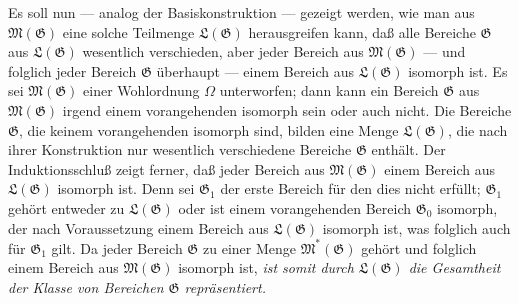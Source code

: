 Es soll nun --- analog der Basiskonstruktion --- gezeigt werden, wie man aus
$\mathfrak M(\mathfrak G)$ eine solche Teilmenge $\mathfrak L(\mathfrak G)$
herausgreifen kann, daß alle Bereiche $\mathfrak G$ aus
$\mathfrak L(\mathfrak G)$ wesentlich verschieden, aber jeder Bereich aus
$\mathfrak M(\mathfrak G)$ --- und folglich jeder Bereich $\mathfrak G$
überhaupt --- einem Bereich aus $\mathfrak L(\mathfrak G)$ isomorph ist. Es sei
$\mathfrak M(\mathfrak G)$ einer Wohlordnung $\Omega$ unterworfen; dann kann
ein Bereich $\mathfrak G$ aus $\mathfrak M(\mathfrak G)$ irgend einem
vorangehenden isomorph sein oder auch nicht. Die Bereiche $\mathfrak G$, die
keinem vorangehenden isomorph sind, bilden eine Menge $\mathfrak L(\mathfrak G)$,
die nach ihrer Konstruktion nur wesentlich verschiedene Bereiche $\mathfrak G$
enthält. Der Induktionsschluß zeigt ferner, daß jeder Bereich aus
$\mathfrak M(\mathfrak G)$ einem Bereich aus $\mathfrak L(\mathfrak G)$ isomorph
ist. Denn sei $\mathfrak G_1$ der erste Bereich für den dies nicht erfüllt;
$\mathfrak G_1$ gehört entweder zu $\mathfrak L(\mathfrak G)$ oder ist einem
vorangehenden Bereich $\mathfrak G_0$ isomorph, der nach Voraussetzung einem
Bereich aus $\mathfrak L(\mathfrak G)$ isomorph ist, was folglich auch für
$\mathfrak G_1$ gilt. Da jeder Bereich $\mathfrak G$ zu einer Menge
$\mathfrak M^*(\mathfrak G)$ gehört und folglich einem Bereich aus
$\mathfrak M(\mathfrak G)$ isomorph ist, \emph{ist somit durch
$\mathfrak L(\mathfrak G)$ die Gesamtheit der Klasse von Bereichen
$\mathfrak G$ repräsentiert.}

